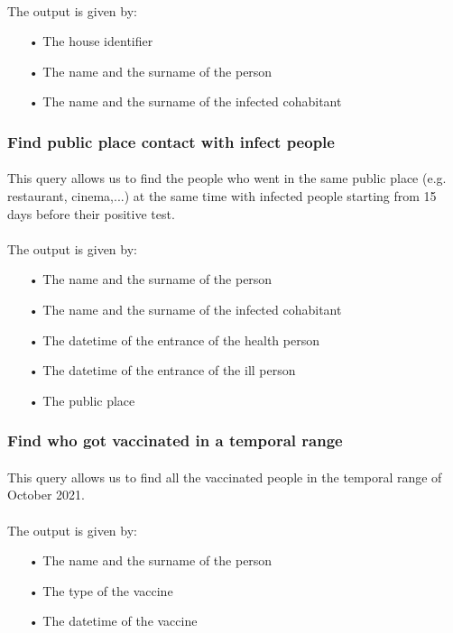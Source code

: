 \documentclass[a4paper,12pt]{article}
\begin{document}
\paragraph{} The output is given by: 
\begin{itemize}
\item[•] The house identifier
\item[•] The name and the surname of the person
\item[•] The name and the surname of the infected cohabitant

\end{itemize}
\subsubsection{Find public place contact with infect people}
\paragraph{} This query allows us to find the people who went in the same public place (e.g. restaurant, cinema,...) at the same time with infected people starting from 15 days before their positive test.
\paragraph{} The output is given by: 
\begin{itemize}
\item[•] The name and the surname of the person
\item[•] The name and the surname of the infected cohabitant
\item[•] The datetime of the entrance of the health person
\item[•] The datetime of the entrance of the ill person
\item[•] The public place
\end{itemize}

\subsubsection{Find who got vaccinated in a temporal range}
\paragraph{} This query allows us to find all the vaccinated people in the temporal range of October 2021.
\paragraph{} The output is given by: 
\begin{itemize}
\item[•] The name and the surname of the person
\item[•] The type of the vaccine
\item[•] The datetime of the vaccine

\end{itemize}
\pagebreak
\end{document}

